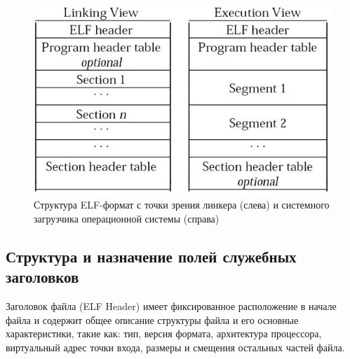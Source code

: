 \begin{figure}[H]
 \centering
 \includegraphics[scale=1]{res/lin_001}
 \caption{Структура ELF-формат с точки зрения линкера (слева) и системного загрузчика операционной системы (справа)}
\end{figure}

\subsection{Структура и назначение полей служебных заголовков}

Заголовок файла (ELF Header) имеет фиксированное расположение в начале файла и содержит общее описание структуры файла и его основные характеристики, такие как: тип, версия формата, архитектура процессора, виртуальный адрес точки входа, размеры и смещения остальных частей файла.

